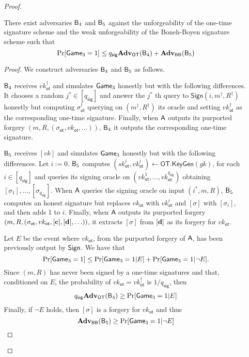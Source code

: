 \begin{proof}
\begin{lemma}  There exist adversaries $\mathsf{B}_4$ and $\mathsf{B}_5$ against the unforgeability of the one-time signature scheme and the weak unforgeability of the Boneh-Boyen signature scheme such that
$$
\Pr[\mathsf{Game}_3=1]\leq q_\mathsf{sig}\mathbf{Adv}_{\mathsf{OT}}(\mathsf{B}_4)+\mathbf{Adv}_{\mathsf{BB}}(\mathsf{B}_5)
$$
\end{lemma}
\begin{proof}
We construct adversaries $\mathsf{B}_4$ and $\mathsf{B}_5$ as follows.

$\mathsf{B}_4$ receives $vk_\mathsf{ot}^\dag$ and simulates $\mathsf{Game}_3$ honestly but with the following differences. It chooses a random $j^*\in[q_\mathsf{sig}]$ and answer the $j^*$ th query to $\mathsf{Sign}(i,m^\dag,R^\dag)$ honestly but computing $\sigma_\mathsf{ot}^\dag$ querying on $(m^\dag,R^\dag)$ its oracle and setting $vk_\mathsf{ot}^\dag$ as the corresponding one-time signature. Finally, when $\mathsf{A}$ outputs its purported forgery $(m,R,(\sigma_\mathsf{ot},vk_\mathsf{ot},\ldots))$, $\mathsf{B}_4$ it outputs the corresponding one-time signature.

$\mathsf{B}_5$ receives $[vk]$ and simulates $\mathsf{Game}_3$ honestly but with the following differences. Let $i:=0$. $\mathsf{B}_5$ computes $(sk_\mathsf{ot}^i,vk_\mathsf{ot}^i)\gets\mathsf{OT}.\mathsf{KeyGen}(gk)$, for each $i\in[q_\mathsf{sig}]$ and queries its signing oracle on $(vk_{\mathsf{ot}}^1,\ldots,vk_\mathsf{ot}^{q_{\mathsf{sig}}})$ obtaining $[\sigma_1],\ldots,[\sigma_{q_\mathsf{sig}}]$. When $\mathsf{A}$ queries the signing oracle on input $(i^*,m,R)$, $\mathsf{B}_5$ computes an honest signature but replaces $vk_\mathsf{ot}$ with $vk_\mathsf{ot}^i$ and $[\sigma]$ with $[\sigma_i]$, and then adds 1 to $i$. Finally, when $\mathsf{A}$ outputs its purported forgery $(m,R,(\sigma_\mathsf{ot},vk_\mathsf{ot},[\mathbf{c}],[\mathbf{d}],\ldots))$, it extracts $[\sigma]$ from $[\mathbf{d}]$ as its forgery for $vk_\mathsf{ot}$.

Let $E$ be the event where $vk_\mathsf{ot}$, from the purported forgery of $\mathsf{A}$, has been previously output by $\mathsf{Sign}$. We have that
$$
\Pr[\mathsf{Game}_3=1]\leq \Pr[\mathsf{Game}_3=1|E]+\Pr[\mathsf{Game}_3=1|\neg E].
$$
Since  $(m,R)$ has never been signed by a one-time signatures and that, conditioned on $E$, the probability of $vk_\mathsf{ot}=vk_\mathsf{ot}^\dag$ is $1/q_\mathsf{sig}$, then
\begin{align*}
q_{\mathsf{sig}}\mathbf{Adv}_\mathsf{OT}(\mathsf{B}_4)\geq  \Pr[\mathsf{Game}_3=1|E]
\end{align*}
Finally, if $\neg E$ holds, then $[\sigma]$ is a forgery for $vk_\mathsf{ot}$ and thus
$$
\mathbf{Adv}_{\mathsf{BB}}(\mathsf{B}_5)\geq \Pr[\mathsf{Game}_3=1|\neg E]$$
\end{proof}
\end{proof}
